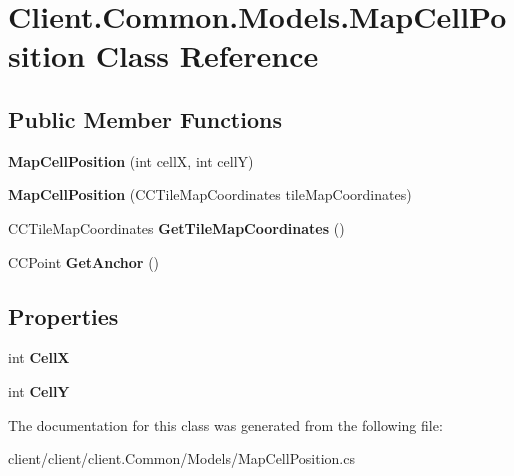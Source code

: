 \hypertarget{classClient_1_1Common_1_1Models_1_1MapCellPosition}{\section{Client.\-Common.\-Models.\-Map\-Cell\-Position Class Reference}
\label{classClient_1_1Common_1_1Models_1_1MapCellPosition}
}
\subsection*{Public Member Functions}
\begin{DoxyCompactItemize}
\item 
\hypertarget{classClient_1_1Common_1_1Models_1_1MapCellPosition_a0a1cdb4e682db8251922ad0628f9b39d}{{\bfseries Map\-Cell\-Position} (int cell\-X, int cell\-Y)}\label{classClient_1_1Common_1_1Models_1_1MapCellPosition_a0a1cdb4e682db8251922ad0628f9b39d}

\item 
\hypertarget{classClient_1_1Common_1_1Models_1_1MapCellPosition_a64af2cde673de32a8bddde96589f2e77}{{\bfseries Map\-Cell\-Position} (C\-C\-Tile\-Map\-Coordinates tile\-Map\-Coordinates)}\label{classClient_1_1Common_1_1Models_1_1MapCellPosition_a64af2cde673de32a8bddde96589f2e77}

\item 
\hypertarget{classClient_1_1Common_1_1Models_1_1MapCellPosition_a01720d038f8cbaa8e2a3aa003fc434a4}{C\-C\-Tile\-Map\-Coordinates {\bfseries Get\-Tile\-Map\-Coordinates} ()}\label{classClient_1_1Common_1_1Models_1_1MapCellPosition_a01720d038f8cbaa8e2a3aa003fc434a4}

\item 
\hypertarget{classClient_1_1Common_1_1Models_1_1MapCellPosition_a401686dcad08fee1b8884f562d12a630}{C\-C\-Point {\bfseries Get\-Anchor} ()}\label{classClient_1_1Common_1_1Models_1_1MapCellPosition_a401686dcad08fee1b8884f562d12a630}

\end{DoxyCompactItemize}
\subsection*{Properties}
\begin{DoxyCompactItemize}
\item 
\hypertarget{classClient_1_1Common_1_1Models_1_1MapCellPosition_a3698c44e12f74fef06625e4bf751620c}{int {\bfseries Cell\-X}}\label{classClient_1_1Common_1_1Models_1_1MapCellPosition_a3698c44e12f74fef06625e4bf751620c}

\item 
\hypertarget{classClient_1_1Common_1_1Models_1_1MapCellPosition_a4051441b879311d5f933fa6a801ed2cd}{int {\bfseries Cell\-Y}}\label{classClient_1_1Common_1_1Models_1_1MapCellPosition_a4051441b879311d5f933fa6a801ed2cd}

\end{DoxyCompactItemize}


The documentation for this class was generated from the following file\-:\begin{DoxyCompactItemize}
\item 
client/client/client.\-Common/\-Models/Map\-Cell\-Position.\-cs\end{DoxyCompactItemize}
